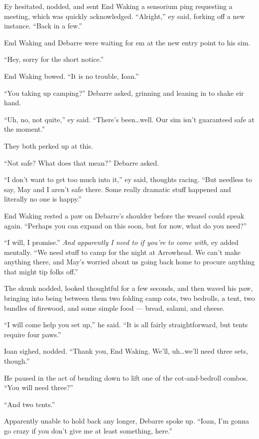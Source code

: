 Ey hesitated, nodded, and sent End Waking a sensorium ping requesting a meeting, which was quickly acknowledged. ``Alright,'' ey said, forking off a new instance. ``Back in a few.''

End Waking and Debarre were waiting for em at the new entry point to his sim.

``Hey, sorry for the short notice.''

End Waking bowed. ``It is no trouble, Ioan.''

``You taking up camping?'' Debarre asked, grinning and leaning in to shake eir hand.

``Uh, no, not quite,'' ey said. ``There's been\ldots well. Our sim isn't guaranteed safe at the moment.''

They both perked up at this.

``Not safe? What does that mean?'' Debarre asked.

``I don't want to get too much into it,'' ey said, thoughts racing. ``But needless to say, May and I aren't safe there. Some really dramatic stuff happened and literally no one is happy.''

End Waking rested a paw on Debarre's shoulder before the weasel could speak again. ``Perhaps you can expand on this soon, but for now, what do you need?''

``I will, I promise.'' \emph{And apparently I need to if you're to come with,} ey added mentally. ``We need stuff to camp for the night at Arrowhead. We can't make anything there, and May's worried about us going back home to procure anything that might tip folks off.''

The skunk nodded, looked thoughtful for a few seconds, and then waved his paw, bringing into being between them two folding camp cots, two bedrolls, a tent, two bundles of firewood, and some simple food — bread, salami, and cheese.

``I will come help you set up,'' he said. ``It is all fairly straightforward, but tents require four paws.''

Ioan sighed, nodded. ``Thank you, End Waking. We'll, uh\ldots we'll need three sets, though.''

He paused in the act of bending down to lift one of the cot-and-bedroll combos. ``You will need three?''

``And two tents.''

Apparently unable to hold back any longer, Debarre spoke up. ``Ioan, I'm gonna go crazy if you don't give me at least something, here.''

